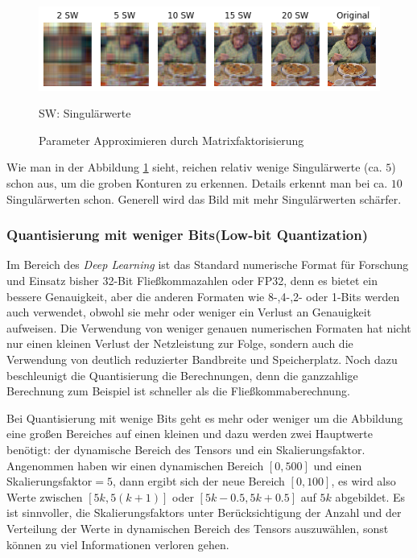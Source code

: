 \documentclass[12pt,a4paper]{scrartcl}
\numberwithin{equation}{section}
\begin{document}
\begin{figure}[h]
	\centering
	\includegraphics[width=\textwidth]{matrix_fatorization}
	\begin{center}
		SW: Singulärwerte
	\end{center}
	\caption{Parameter Approximieren durch Matrixfaktorisierung }
	\label{fig:matrix_fatorization}
\end{figure}
Wie man in der Abbildung \ref{fig:matrix_fatorization} sieht, reichen  relativ wenige Singulärwerte (ca. $ 5 $) schon aus, um die groben Konturen zu erkennen. Details erkennt man bei ca. $ 10 $ Singulärwerten schon. Generell wird das Bild mit mehr Singulärwerten schärfer.

\subsubsection{Quantisierung mit weniger Bits(Low-bit Quantization)}
Im Bereich des \textit{Deep Learning} ist das Standard numerische Format für Forschung und Einsatz bisher 32-Bit Fließkommazahlen oder FP32, denn es bietet ein bessere Genauigkeit, aber die anderen Formaten wie 8-,4-,2- oder 1-Bits werden auch verwendet, obwohl sie mehr oder weniger ein Verlust an Genauigkeit aufweisen.
Die Verwendung von weniger genauen numerischen Formaten hat nicht nur einen kleinen Verlust der Netzleistung zur Folge, sondern auch die Verwendung von deutlich reduzierter Bandbreite und Speicherplatz. Noch dazu beschleunigt die Quantisierung die Berechnungen, denn die ganzzahlige Berechnung zum Beispiel ist schneller als die Fließkommaberechnung.

Bei Quantisierung mit wenige Bits geht es mehr oder weniger um die Abbildung eine großen Bereiches auf einen kleinen und dazu werden zwei Hauptwerte benötigt: der dynamische Bereich des Tensors und ein Skalierungsfaktor. Angenommen haben wir einen dynamischen Bereich $ [0,500] $ und einen Skalierungsfaktor$= 5 $, dann ergibt sich der neue Bereich $ [0, 100] $, es wird also Werte zwischen $ [5k, 5(k+1)] $ oder $ [5k -0.5, 5k +0.5] $ auf $ 5k $ abgebildet. Es ist sinnvoller,  die Skalierungsfaktors unter Berücksichtigung der Anzahl und der Verteilung der Werte in dynamischen Bereich des Tensors auszuwählen, sonst können zu viel Informationen verloren gehen.
\end{document}
